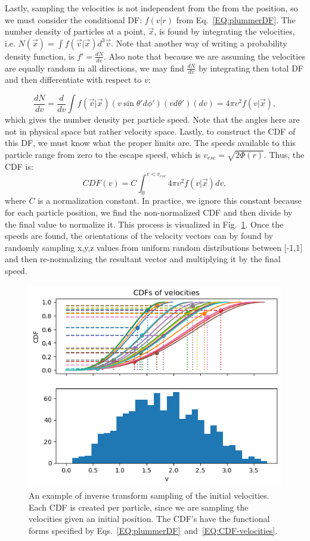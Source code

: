 Lastly, sampling the velocities is not independent from the from the position, so we must consider the conditional DF: $f(v|r)$ from Eq.~\ref{EQ:plummerDF}. The number density of particles at a point, $\vec{x}$, is found by integrating the velocities, i.e. $N(\vec{x})=\int f(\vec{v}|\vec{x})d^3\vec{v}$. Note that another way of writing a probability density function, is $f'=\frac{dN}{dv}$. Also note that because we are assuming the velocities are equally random in all directions, we may find $\frac{dN}{dv}$ by integrating then total DF and then differentiate with respect to $v$:

\begin{equation}
    \frac{dN}{dv} = \frac{d}{dv}\int f(\vec{v}|\vec{x}) (v\sin\theta'd\phi')(vd\theta')(dv) = 4\pi v^2 f(v|\vec{x}),
\end{equation}
which gives the number density per particle speed. Note that the angles here are not in physical space but rather velocity space. Lastly, to construct the CDF of this DF, we must know what the proper limits are. The speeds available to this particle range from zero to the escape speed, which is $v_{esc}=\sqrt{2\Phi(r)}$. Thus, the CDF is:
\begin{equation}\label{EQ:CDF-velocities}
    CDF(v) = C \int_0^{v<v_{esc}} 4\pi v^2 f(v|\vec{x}) dv,
\end{equation}
where $C$ is a normalization constant. In practice, we ignore this constant because for each particle position, we find the non-normalized CDF and then divide by the final value to normalize it. This process is visualized in Fig.~\ref{fig:cdf-velocities}. Once the speeds are found, the orientations of the velocity vectors can by found by randomly sampling x,y,z values from uniform random distributions between [-1,1] and then re-normalizing the resultant vector and multiplying it by the final speed. 

\begin{figure}
    \centering
    \includegraphics[width=0.75\linewidth]{images/cdf-velocities.png}
    \caption{An example of inverse transform sampling of the initial velocities. Each CDF is created per particle, since we are sampling the velocities given an initial position. The CDF's have the functional forms specified by Eqs.~\ref{EQ:plummerDF}~and~\ref{EQ:CDF-velocities}.}
    \label{fig:cdf-velocities}
\end{figure}


